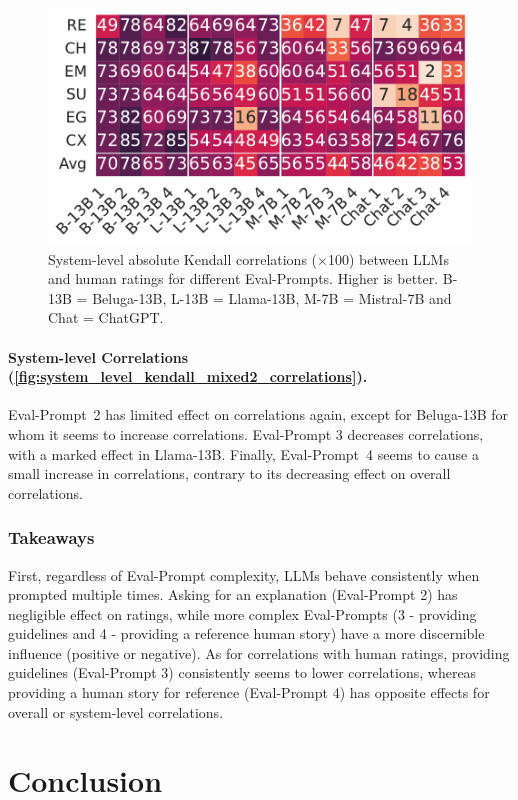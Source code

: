 \begin{figure}[!h]
    \centering
    \includegraphics[width=0.8\columnwidth]{pictures/llm_mixed2_w_system_kendall.pdf}
    \caption{System-level absolute Kendall correlations ($\times$100) between LLMs and human ratings for different Eval-Prompts. Higher is better. B-13B = Beluga-13B, L-13B = Llama-13B, M-7B = Mistral-7B and Chat = ChatGPT.}
    \label{fig:system_level_kendall_mixed2_correlations}
\end{figure}

\paragraph{System-level Correlations (\autoref{fig:system_level_kendall_mixed2_correlations}).}

Eval-Prompt~2 has limited effect on correlations again, except for Beluga-13B for whom it seems to increase correlations. Eval-Prompt 3 decreases correlations, with a marked effect in Llama-13B. Finally, Eval-Prompt~4 seems to cause a small increase in correlations, contrary to its decreasing effect on overall correlations.

\subsubsection{Takeaways}
First, regardless of Eval-Prompt complexity, LLMs behave consistently when prompted multiple times. Asking for an explanation (Eval-Prompt 2) has negligible effect on ratings, while more complex Eval-Prompts (3 - providing guidelines and 4 - providing a reference human story) have a more discernible influence (positive or negative). As for correlations with human ratings, providing guidelines (Eval-Prompt 3) consistently seems to lower correlations, whereas providing a human story for reference (Eval-Prompt 4) has opposite effects for overall or system-level correlations.
\section{Conclusion}
\label{sec:llm_conclusion}

